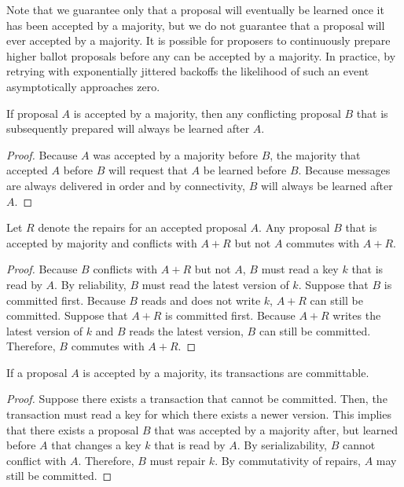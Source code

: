 \documentclass[../main.tex]{subfiles}
\begin{document}
  Note that we guarantee only that a proposal will eventually be learned once it has been accepted
  by a majority, but we do not guarantee that a proposal will ever accepted by a majority. It is
  possible for proposers to continuously prepare higher ballot proposals before any can be
  accepted by a majority. In practice, by retrying with exponentially jittered backoffs the
  likelihood of such an event asymptotically approaches zero. \\

  \begin{theorem}[Serializability]
    If proposal $A$ is accepted by a majority, then any conflicting proposal $B$ that is
    subsequently prepared will always be learned after $A$.
  \end{theorem}
  \begin{proof}
    Because $A$ was accepted by a majority before $B$, the majority that accepted $A$ before $B$
    will request that $A$ be learned before $B$. Because messages are always delivered in order
    and by connectivity, $B$ will always be learned after $A$.
  \end{proof}

  \begin{theorem}
    Let $R$ denote the repairs for an accepted proposal $A$. Any proposal $B$ that is accepted by
    majority and conflicts with $A + R$ but not $A$ commutes with $A + R$.
  \end{theorem}
  \begin{proof}
    Because $B$ conflicts with $A + R$ but not $A$, $B$ must read a key $k$ that is read by $A$.
    By reliability, $B$ must read the latest version of $k$. Suppose that $B$ is committed first.
    Because $B$ reads and does not write $k$, $A + R$ can still be committed. Suppose that
    $A + R$ is committed first. Because $A + R$ writes the latest version of $k$ and $B$ reads the
    latest version, $B$ can still be committed. Therefore, $B$ commutes with $A + R$.
  \end{proof}

  \begin{theorem}[Consistency]
    If a proposal $A$ is accepted by a majority, its transactions are committable.
  \end{theorem}
  \begin{proof}
    Suppose there exists a transaction that cannot be committed. Then, the transaction must read a
    key for which there exists a newer version. This implies that there exists a proposal $B$ that
    was accepted by a majority after, but learned before $A$ that changes a key $k$ that is read
    by $A$. By serializability, $B$ cannot conflict with $A$. Therefore, $B$ must repair $k$. By
    commutativity of repairs, $A$ may still be committed.
  \end{proof}
\end{document}
